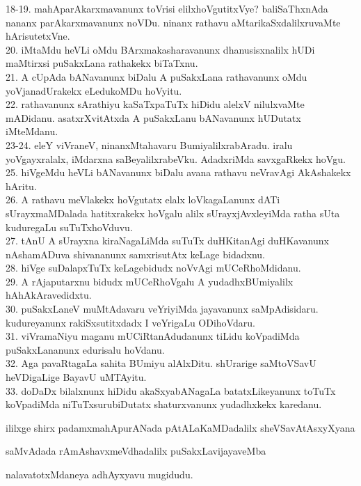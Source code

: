 \documentclass{article}
\begin{document}
18-19. mahAparAkarxmavanunx toVrisi elilxhoVgutitxVye? baliSaThxnAda nananx parAkarxmavanunx noVDu. ninanx rathavu aMtarikaSxdalilxruvaMte hArisutetxVne.\\
20. iMtaMdu heVLi oMdu BArxmakasharavanunx dhanusisxnalilx hUDi maMtirxsi puSakxLana rathakekx biTaTxnu.\\
21. A cUpAda bANavanunx biDalu A puSakxLana rathavanunx oMdu yoVjanadUrakekx eLedukoMDu hoVyitu.\\
22. rathavanunx sArathiyu kaSaTxpaTuTx hiDidu alelxV nilulxvaMte mADidanu. asatxrXvitAtxda A puSakxLanu bANavanunx hUDutatx iMteMdanu.\\
23-24. eleY viVraneV, ninanxMtahavaru BumiyalilxrabAradu. iralu yoVgayxralalx, iMdarxna saBeyalilxrabeVku. AdadxriMda savxgaRkekx hoVgu.\\
25. hiVgeMdu heVLi bANavanunx biDalu avana rathavu neVravAgi AkAshakekx hAritu.\\
26. A rathavu meVlakekx hoVgutatx elalx loVkagaLanunx dATi sUrayxmaMDalada hatitxrakekx hoVgalu alilx sUrayxjAvxleyiMda ratha sUta kuduregaLu suTuTxhoVduvu.\\
27. tAnU A sUrayxna kiraNagaLiMda suTuTx duHKitanAgi duHKavanunx nAshamADuva shivananunx samxrisutAtx keLage bidadxnu.\\
28. hiVge suDalapxTuTx keLagebidudx noVvAgi mUCeRhoMdidanu.\\
29. A rAjaputarxnu bidudx mUCeRhoVgalu A yudadhxBUmiyalilx hAhAkAravedidxtu.\\
30. puSakxLaneV muMtAdavaru veYriyiMda jayavanunx saMpAdisidaru. kudureyanunx rakiSxsutitxdadx I veYrigaLu ODihoVdaru.\\
31. viVramaNiyu maganu mUCiRtanAdudanunx tiLidu koVpadiMda puSakxLananunx edurisalu hoVdanu.\\
32. Aga pavaRtagaLa sahita BUmiyu alAlxDitu. shUrarige saMtoVSavU heVDigaLige BayavU uMTAyitu.\\
33. doDaDx bilalxnunx hiDidu akaSxyabANagaLa batatxLikeyanunx toTuTx koVpadiMda niTuTxsurubiDutatx shaturxvanunx yudadhxkekx karedanu.

\begin{center}
ililxge shirx padamxmahApurANada pAtALaKaMDadalilx sheVSavAtAsxyXyana
\end{center}

\begin{center}
saMvAdada rAmAshavxmeVdhadalilx puSakxLavijayaveMba
\end{center}

\begin{center}
nalavatotxMdaneya adhAyxyavu mugidudu.
\end{center}
\end{document}
